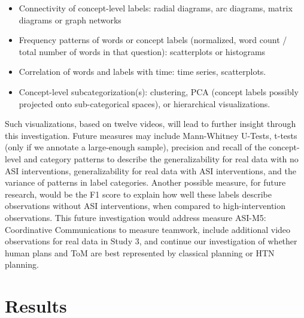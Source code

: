 \begin{itemize}

    \item Connectivity of concept-level labels: radial diagrams, arc diagrams,
        matrix diagrams or graph networks

    \item Frequency patterns of words or concept labels (normalized, word count
        / total number of words in that question): scatterplots or histograms

    \item Correlation of words and labels with time: time series, scatterplots. 

    \item Concept-level subcategorization(s): clustering, PCA (concept labels
        possibly projected onto sub-categorical spaces), or hierarchical
        visualizations.

\end{itemize}


Such visualizations, based on twelve videos, will lead to further insight
through this investigation. Future measures may include Mann-Whitney U-Tests,
t-tests (only if we annotate a large-enough sample), precision and recall of
the concept-level and category patterns to describe the generalizability for
real data with no ASI interventions, generalizability for real data with ASI
interventions, and the variance of patterns in label categories. Another
possible measure, for future research, would be the F1 score to explain how
well these labels describe observations without ASI interventions, when
compared to high-intervention observations. This future investigation would
address measure ASI-M5: Coordinative Communications to
measure teamwork, include additional video observations for real data in Study
3, and continue our investigation of whether human plans and ToM are best
represented by classical planning or HTN planning.



\section{Results}

